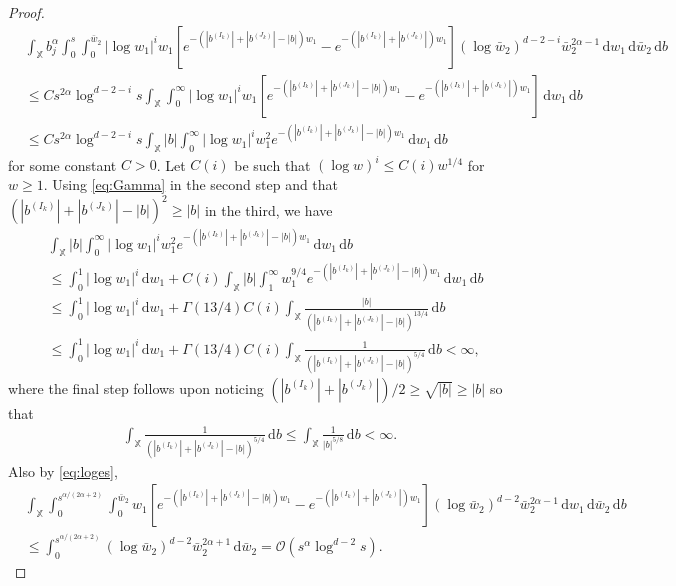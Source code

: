 \documentclass[11pt,reqno]{amsart}
\numberwithin{equation}{section}
\theoremstyle{definition}
\newcommand{\XX}{\mathbb{X}}
\newcommand{\diff}{{\,\mathrm d}}
\begin{document}
\begin{proof}
\begin{align}
		&\int_{\XX } b_j^\alpha \int_0^s \int_{0}^{\bar w_2} |\log w_1|^i w_1  \left[e^{-(|b^{(I_k)}| + |b^{(J_k)}|-|b|)w_1} - e^{-(|b^{(I_k)}| + |b^{(J_k)}|)w_1} \right] (\log \bar w_2)^{d-2-i}  \bar w_2^{2\alpha-1}  \diff w_1 \diff \bar w_2  \diff b\nonumber\\
		& \le C s^{2\alpha} \log^{d-2-i}s  \int_{\XX } \int_{0}^{\infty} |\log w_1|^i w_1  \left[e^{-(|b^{(I_k)}| + |b^{(J_k)}|-|b|)w_1} - e^{-(|b^{(I_k)}| + |b^{(J_k)}|)w_1} \right] \diff w_1  \diff b\nonumber\\
		& \le C s^{2\alpha} \log^{d-2-i}s  \int_{\XX } |b| \int_0^\infty |\log w_1|^iw_1^2  e^{-(|b^{(I_k)}| + |b^{(J_k)}|-|b|)w_1} \diff w_1 \diff b
		\end{align}
for some constant $C>0$.
Let $C(i)$ be such that $(\log w)^i \le C(i) w^{1/4}$ for $w \ge 1$. Using \eqref{eq:Gamma} in the second step and that $(|b^{(I_k)}| + |b^{(J_k)}|-|b|)^{2} \ge |b|$ in the third, we have
	\begin{align}\label{eq:arg}
	&\int_{\XX } |b| \int_0^\infty |\log w_1|^i w_1^2  e^{-(|b^{(I_k)}| + |b^{(J_k)}|-|b|)w_1} \diff w_1 \diff b\nonumber\\
	&\le \int_0^1 |\log w_1|^i \diff w_1+C(i) \int_{\XX } |b| \int_1^\infty w_1^{9/4}  e^{-(|b^{(I_k)}| + |b^{(J_k)}|-|b|)w_1} \diff w_1 \diff b\nonumber\\
	& \le \int_0^1 |\log w_1|^i \diff w_1 + \Gamma (13/4) C(i) \int_{\XX }  \frac{ |b|}{(|b^{(I_k)}| + |b^{(J_k)}|-|b|)^{13/4}}  \diff b\nonumber\\
	& \le \int_0^1 |\log w_1|^i \diff w_1 + \Gamma (13/4) C(i) \int_{\XX } \frac{1}{(|b^{(I_k)}| + |b^{(J_k)}|-|b|)^{5/4}}  \diff b<\infty,
\end{align}
where the final step follows upon noticing $(|b^{(I_k)}| + |b^{(J_k)}|)/2 \ge \sqrt{|b|} \ge |b|$ so that
\begin{align*}
	\int_{\XX } \frac{1}{(|b^{(I_k)}| + |b^{(J_k)}|-|b|)^{5/4}}  \diff b \le \int_{\XX } \frac{1}{|b|^{5/8}}  \diff b <\infty.
\end{align*}
Also by \eqref{eq:loges},
	\begin{align*}
		&\int_{\XX }  \int_0^{s^{\alpha/(2\alpha+2)}} \int_{0}^{\bar w_2} w_1 \left[e^{-(|b^{(I_k)}| + |b^{(J_k)}|-|b|)w_1} - e^{-(|b^{(I_k)}| + |b^{(J_k)}|)w_1} \right](\log \bar w_2)^{d-2}  \bar w_2^{2\alpha-1}  \diff w_1 \diff \bar w_2  \diff b\nonumber\\
		& \le \int_0^{s^{\alpha/(2\alpha+2)}}  (\log \bar w_2)^{d-2}  \bar w_2^{2\alpha+1} \diff \bar w_2  =\mathcal{O}(s^\alpha \log^{d-2}s).

\end{align*}
\end{proof}
\end{document}
